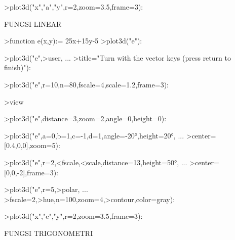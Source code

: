\documentclass[a4paper,10pt]{article}
\begin{document}
\begin{eulernotebook}
\begin{eulerprompt}
>plot3d("x","a","y",r=2,zoom=3.5,frame=3):
\end{eulerprompt}
\begin{eulercomment}
FUNGSI LINEAR\\
\end{eulercomment}
\eulersubheading{}
\begin{eulerprompt}
>function e(x,y):= 25x+15y-5
>plot3d("e"):
\end{eulerprompt}
\begin{eulerprompt}
>plot3d("e",>user, ...
>title="Turn with the vector keys (press return to finish)"):
\end{eulerprompt}
\begin{eulerprompt}
>plot3d("e",r=10,n=80,fscale=4,scale=1.2,frame=3):
\end{eulerprompt}
\begin{eulerprompt}
>view
\end{eulerprompt}
\begin{euleroutput}
  [5,  2.6,  2,  0.4]
\end{euleroutput}
\begin{eulerprompt}
>plot3d("e",distance=3,zoom=2,angle=0,height=0):
\end{eulerprompt}
\begin{eulerprompt}
>plot3d("e",a=0,b=1,c=-1,d=1,angle=-20°,height=20°, ...
>center=[0.4,0,0],zoom=5):
\end{eulerprompt}
\begin{eulerprompt}
>plot3d("e",r=2,<fscale,<scale,distance=13,height=50°, ...
>center=[0,0,-2],frame=3):
\end{eulerprompt}
\begin{eulerprompt}
>plot3d("e",r=5,>polar, ...
>fscale=2,>hue,n=100,zoom=4,>contour,color=gray):
\end{eulerprompt}
\begin{eulerprompt}
>plot3d("x","e","y",r=2,zoom=3.5,frame=3):
\end{eulerprompt}
\begin{eulercomment}
FUNGSI TRIGONOMETRI\\
\end{eulercomment}

\end{eulernotebook}
\end{document}
